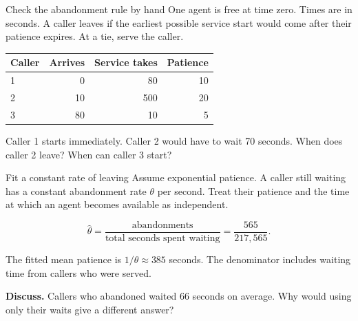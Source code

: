 \documentclass{beamer}
\begin{document}
\begin{frame}{Check the abandonment rule by hand}
  \small
  One agent is free at time zero. Times are in seconds. A caller leaves
  if the earliest possible service start would come after their patience
  expires. At a tie, serve the caller.

  \vspace{0.65em}
  \centering
  \begin{tabular}{@{}lrrr@{}}
    \toprule
    Caller & Arrives & Service takes & Patience\\
    \midrule
    1 &  0 & 80 & 10\\
    2 & 10 & 500 & 20\\
    3 & 80 &  10 &  5\\
    \bottomrule
  \end{tabular}

  \vspace{0.65em}
  \raggedright
  Caller 1 starts immediately. Caller 2 would have to wait 70 seconds.
  When does caller 2 leave? When can caller 3 start?
\end{frame}

\begin{frame}{Fit a constant rate of leaving}
  Assume exponential patience. A caller still waiting has a constant
  abandonment rate $\theta$ per second. Treat their patience and the
  time at which an agent becomes available as independent.

  \[
    \widehat{\theta} =
      \frac{\text{abandonments}}{\text{total seconds spent waiting}}
    = \frac{565}{217{,}565}.
  \]

  The fitted mean patience is $1/\widehat{\theta}\approx385$ seconds.
  The denominator includes waiting time from callers who were served.

  \vspace{0.4em}
  \textbf{Discuss.} Callers who abandoned waited 66 seconds on average.
  Why would using only their waits give a different answer?
\end{frame}
\end{document}
